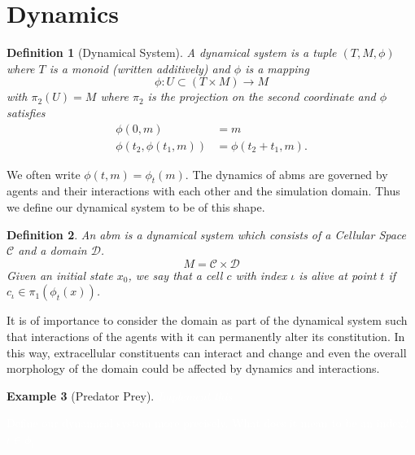 \documentclass{article}
\newcommand{\todo}[1]{\colorbox{WildStrawberry}{\textcolor{white}{#1}}}
\newtheorem{definition}{Definition}[section]
\newtheorem{example}[definition]{Example}
\begin{document}
\section{Dynamics}
\label{section:dynamics}
\begin{definition}[Dynamical System]
    A dynamical system is a tuple $(T,M,\phi)$ where $T$ is a monoid (written additively) and
    $\phi$ is a mapping
    \begin{equation}
        \phi : U\subset(T\times M) \rightarrow M
    \end{equation}
    with $\pi_2(U) = M$ where $\pi_2$ is the projection on the second coordinate and $\phi$
    satisfies
    \begin{align}
        \phi(0,m) &= m\\
        \phi(t_2, \phi(t_1, m)) &= \phi(t_2+t_1,m).
    \end{align}
\end{definition}

We often write $\phi(t,m) = \phi_t(m)$.
The dynamics of \acp{abm} are governed by agents and their interactions with each other and the
simulation domain.
Thus we define our dynamical system to be of this shape.

\begin{definition}
    An \ac{abm} is a dynamical system which consists of a Cellular Space $\mathscr{C}$ and a domain
    $\mathscr{D}$.
    \begin{equation}
        M = \mathscr{C}\times\mathscr{D}
    \end{equation}
    Given an initial state $x_0$, we say that a cell $c$ with index $\iota$ is alive at point $t$ if
    $c_\iota\in\pi_1(\phi_t(x))$.
\end{definition}

It is of importance to consider the domain as part of the dynamical system such that interactions
of the agents with it can permanently alter its constitution.
In this way, extracellular constituents can interact and change and even the overall morphology of
the domain could be affected by dynamics and interactions.

\begin{example}[Predator Prey]
    \todo{Implement this}
\end{example}


\todo{Define our dynamical system more precisely. What does it mean to be an index?
$\iota\in\phi_t$}
\end{document}

